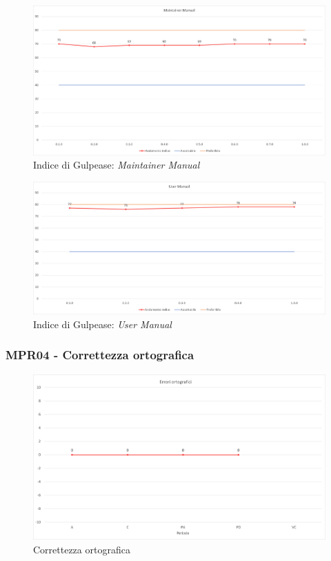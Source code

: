 \pagebreak
\begin{figure}[!ht]
    \caption{Indice di Gulpease: \textit{Maintainer Manual}}
    \vspace{10px}
    \includegraphics[scale=0.5]{sezioni/immagini/MaintainerManualGulpease.png}
    \centering
\end{figure}
\begin{figure}[!ht]
    \caption{Indice di Gulpease: \textit{User Manual}}
    \vspace{10px}
    \includegraphics[scale=0.5]{sezioni/immagini/UserManualGulpease.png}
    \centering
\end{figure}
\pagebreak
\subsubsection{MPR04 - Correttezza ortografica}
\begin{figure}[!ht]
    \caption{Correttezza ortografica}
    \vspace{10px}
    \includegraphics[scale=0.5]{sezioni/immagini/CorrettezzaOrtografica.png}
    \centering
\end{figure}
